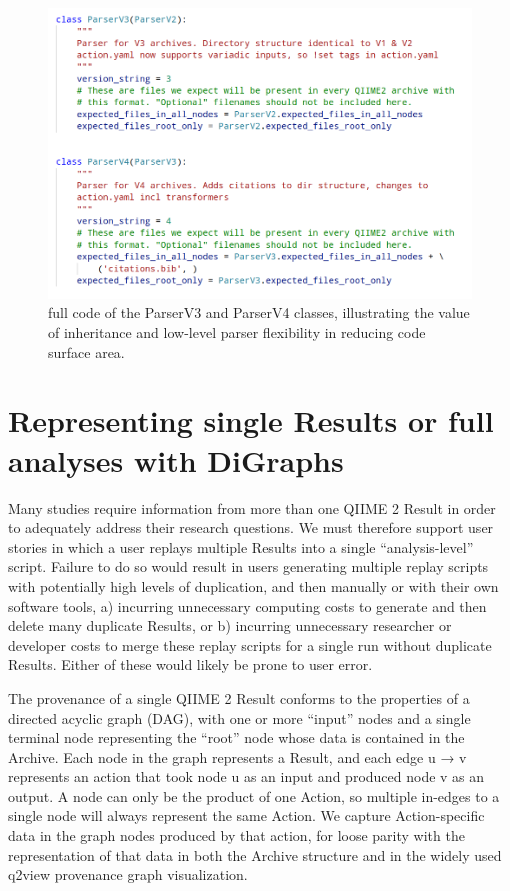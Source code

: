 \begin{figure}[htp]
\centering
\includegraphics[width=\textwidth]{figures/parserCodeBlock.png}
\caption[Code snippet illustrating the value of inheritance to ArchiveParser Versions]%
{full code of the ParserV3 and ParserV4 classes, illustrating the value of
inheritance and low-level parser flexibility in reducing code surface area.}
\label{fig:parserCodeBlock}
\end{figure}


\section{Representing single Results or full analyses with DiGraphs}

Many studies require information from more than one QIIME 2 Result in order to
adequately address their research questions. We must therefore support user
stories in which a user replays multiple Results into a single “analysis-level”
script. Failure to do so would result in users generating multiple replay
scripts with potentially high levels of duplication, and then manually or with
their own software tools, a) incurring unnecessary computing costs to generate
and then delete many duplicate Results, or b) incurring unnecessary researcher
or developer costs to merge these replay scripts for a single run without
duplicate Results. Either of these would likely be prone to user error. 

The provenance of a single QIIME 2 Result conforms to the properties of a
directed acyclic graph (DAG), with one or more “input” nodes and a single
terminal node representing the “root” node whose data is contained in the
Archive. Each node in the graph represents a Result, and each edge u → v
represents an action that took node u as an input and produced node v as an
output. A node can only be the product of one Action, so multiple in-edges to a
single node will always represent the same Action. We capture Action-specific
data in the graph nodes produced by that action, for loose parity with the
representation of that data in both the Archive structure and in the widely used
q2view provenance graph visualization. 


